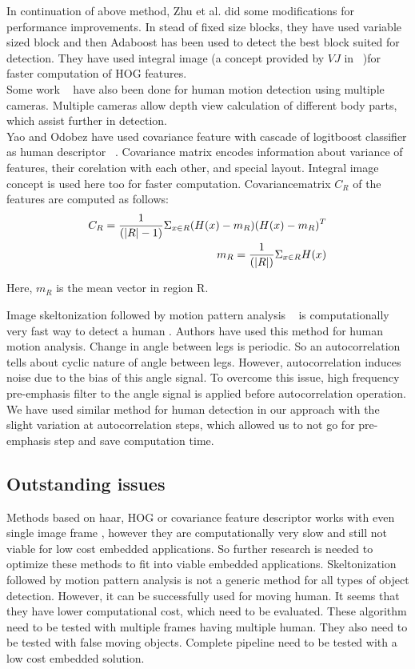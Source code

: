 \indent In continuation of above method, Zhu et al. did some
modifications for performance improvements. In stead of fixed size
blocks, they have used variable sized block and then Adaboost has been
used to detect the best block suited for detection. They have used
integral image (a concept provided by $VJ$ in ~\cite{17})for faster
computation of HOG features.\\

\indent Some work ~\cite{30} have also been done for human motion
detection using multiple cameras. Multiple cameras allow depth view
calculation of different body parts, which assist further in
detection.\\

\indent Yao and Odobez have used covariance feature with cascade of
logitboost classifier as human descriptor ~\cite{19}. Covariance matrix
encodes information about variance of features, their corelation with
each other, and special layout. Integral image concept is used here too
for faster computation. Covariancematrix $C_R$ of the features are
computed as follows:\\
\begin{eqnarray}
C_R = {1 \over {(|R| - 1)}} \Sigma _{x \in R} (H(x) - m_R) (H(x) - m_R)^T \nonumber \\
m_R = {1 \over {(|R|)}} \Sigma _{x \in R} H(x)
\end{eqnarray}

Here, $m_R$ is the mean vector in region R.

\indent Image skeltonization followed by motion pattern analysis
~\cite{32, 22, 31} is computationally very fast way to detect a human .
Authors have used this method for human motion analysis. Change in angle
between legs is periodic. So an autocorrelation tells about cyclic
nature of angle between legs.  However, autocorrelation induces noise
due to the bias of this angle signal.  To overcome this issue, high
frequency pre-emphasis filter to the angle signal is applied before
autocorrelation operation. We have used similar method for human
detection in our approach with the slight variation at autocorrelation
steps, which allowed us to not go for pre-emphasis step and save
computation time.\\

\subsection{Outstanding issues}
\indent Methods based on haar, HOG or covariance feature descriptor
works with even single image frame , however they are computationally
very slow and still not viable for low cost embedded applications. So
further research is needed to optimize these methods to fit into viable
embedded applications. Skeltonization followed by motion pattern
analysis is not a generic method for all types of object detection.
However, it can be successfully used for moving human. It seems that
they have lower computational cost, which need to be evaluated. These
algorithm need to be tested with multiple frames having multiple human.
They also need to be tested with false moving objects. Complete pipeline
need to be tested with a low cost embedded solution.\\

